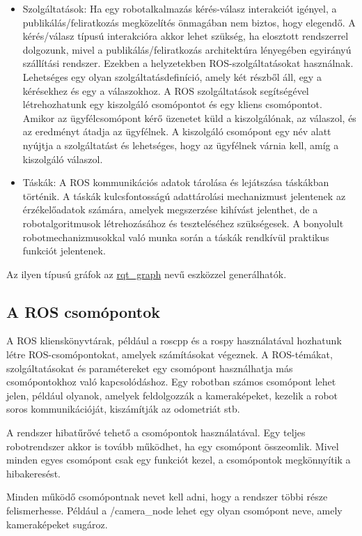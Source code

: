 \documentclass{article}
\begin{document}
\begin{itemize}
    \item Szolgáltatások: Ha egy robotalkalmazás kérés-válasz interakciót igényel, a publikálás/feliratkozás megközelítés önmagában nem biztos, hogy elegendő. A kérés/válasz típusú interakcióra akkor lehet szükség, ha elosztott rendszerrel dolgozunk, mivel a publikálás/feliratkozás architektúra lényegében egyirányú szállítási rendszer. Ezekben a helyzetekben ROS-szolgáltatásokat használnak. Lehetséges egy olyan szolgáltatásdefiníció, amely két részből áll, egy a kérésekhez és egy a válaszokhoz. A ROS szolgáltatások segítségével létrehozhatunk egy kiszolgáló csomópontot és egy kliens csomópontot. Amikor az ügyfélcsomópont kérő üzenetet küld a kiszolgálónak, az válaszol, és az eredményt átadja az ügyfélnek. A kiszolgáló csomópont egy név alatt nyújtja a szolgáltatást és lehetséges, hogy az ügyfélnek várnia kell, amíg a kiszolgáló válaszol.
    \item Táskák: A ROS kommunikációs adatok tárolása és lejátszása táskákban történik. A táskák kulcsfontosságú adattárolási mechanizmust jelentenek az érzékelőadatok számára, amelyek megszerzése kihívást jelenthet, de a robotalgoritmusok létrehozásához és teszteléséhez szükségesek. A bonyolult robotmechanizmusokkal való munka során a táskák rendkívül praktikus funkciót jelentenek.
\end{itemize}
Az ilyen típusú gráfok az \href{http://wiki.ros.org/rqt_graph}{rqt\_graph} nevű eszközzel generálhatók.

\subsection{A ROS csomópontok}
A ROS klienskönyvtárak, például a roscpp és a rospy használatával hozhatunk létre ROS-csomópontokat, amelyek számításokat végeznek. A ROS-témákat, szolgáltatásokat és paramétereket egy csomópont használhatja más csomópontokhoz való kapcsolódáshoz. Egy robotban számos csomópont lehet jelen, például olyanok, amelyek feldolgozzák a kameraképeket, kezelik a robot soros kommunikációját, kiszámítják az odometriát stb.

A rendszer hibatűrővé tehető a csomópontok használatával. Egy teljes robotrendszer akkor is tovább működhet, ha egy csomópont összeomlik. Mivel minden egyes csomópont csak egy funkciót kezel, a csomópontok megkönnyítik a hibakeresést.

Minden működő csomópontnak nevet kell adni, hogy a rendszer többi része felismerhesse. Például a /camera\_node lehet egy olyan csomópont neve, amely kameraképeket sugároz.
\end{document}
